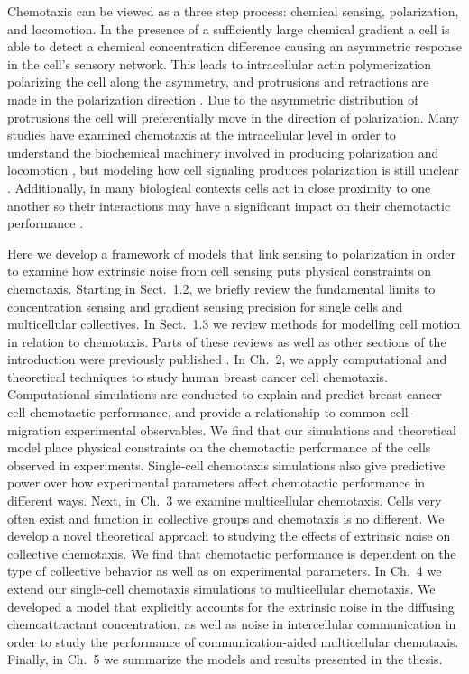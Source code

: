 Chemotaxis can be viewed as a three step process: chemical sensing, polarization, and locomotion. In the presence of a sufficiently large chemical gradient a cell is able to detect a chemical concentration difference causing an asymmetric response in the cell's sensory network. This leads to intracellular actin polymerization polarizing the cell along the asymmetry, and protrusions and retractions are made in the polarization direction \cite{jilkine2011comparison}. Due to the asymmetric distribution of protrusions the cell will preferentially move in the direction of polarization. Many studies have examined chemotaxis at the intracellular level in order to understand the biochemical machinery involved in producing polarization and locomotion \cite{petrie2009random}, but modeling how cell signaling produces polarization is still unclear \cite{iglesias2008navigating}. Additionally, in many biological contexts cells act in close proximity to one another so their interactions may have a significant impact on their chemotactic performance \cite{theveneau2010collective}.

Here we develop a framework of models that link sensing to polarization in order to examine how extrinsic noise from cell sensing puts physical constraints on chemotaxis. Starting in Sect.\ 1.2, we briefly review the fundamental limits to concentration sensing and gradient sensing precision for single cells and multicellular collectives. In Sect.\ 1.3 we review methods for modelling cell motion in relation to chemotaxis. Parts of these reviews as well as other sections of the introduction were previously published \cite{varennes2016sense}. In Ch.\ 2, we apply computational and theoretical techniques to study human breast cancer cell chemotaxis. Computational simulations are conducted to explain and predict breast cancer cell chemotactic performance, and provide a relationship to common cell-migration experimental observables. We find that our simulations and theoretical model place physical constraints on the chemotactic performance of the cells observed in experiments. Single-cell chemotaxis simulations also give predictive power over how experimental parameters affect chemotactic performance in different ways.
Next, in Ch.\ 3 we examine multicellular chemotaxis. Cells very often exist and function in collective groups and chemotaxis is no different. We develop a novel theoretical approach to studying the effects of extrinsic noise on collective chemotaxis. We find that chemotactic performance is dependent on the type of collective behavior as well as on experimental parameters.
In Ch.\ 4 we extend our single-cell chemotaxis simulations to multicellular chemotaxis. We developed a model that explicitly accounts for the extrinsic noise in the diffusing chemoattractant concentration, as well as noise in intercellular communication in order to study the performance of communication-aided multicellular chemotaxis. Finally, in Ch.\ 5 we summarize the models and results presented in the thesis.

